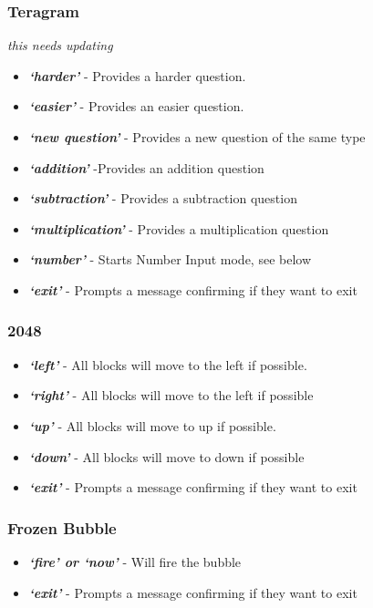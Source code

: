 \documentclass[11pt, oneside]{article}
\begin{document}
\subsubsection{Teragram}

{\em this needs updating}
\begin{itemize}
  \item {\em\bf`harder'} - Provides a harder question. 
  \item {\em\bf`easier'} - Provides an easier question.
  \item {\em\bf`new question'} - Provides a new question of the same type
  \item {\em\bf`addition'} -Provides an addition question
  \item {\em\bf`subtraction'} - Provides a subtraction question
  \item {\em\bf`multiplication'} - Provides a multiplication question 
  \item {\em\bf`number'} - Starts Number Input mode, see below
  \item {\em\bf`exit'} - Prompts a message confirming if they want to exit
 
\end{itemize}

\subsubsection{2048}

\begin{itemize}
	\item {\em\bf`left'} - All blocks will move to the left if possible. 
	\item {\em\bf`right'} - All blocks will move to the left if possible
	\item {\em\bf`up'} - All blocks will move to up if possible. 
	\item {\em\bf`down'} - All blocks will move to down if possible
	\item {\em\bf`exit'} - Prompts a message confirming if they want to exit
	
\end{itemize}

\subsubsection{Frozen Bubble}

\begin{itemize}
	\item {\em\bf`fire' or `now'} - Will fire the bubble
	\item {\em\bf`exit'} - Prompts a message confirming if they want to exit
	
\end{itemize}
\end{document}
